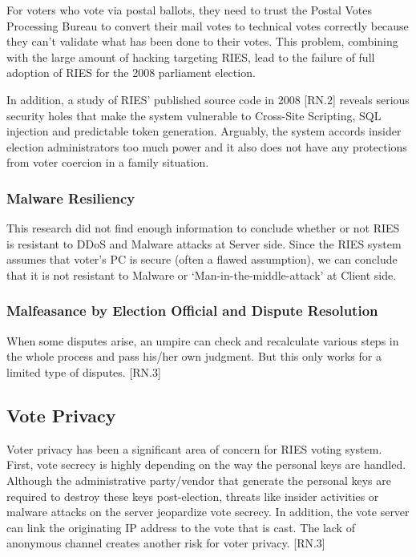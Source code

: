 For voters who vote via postal ballots, they need to trust the Postal Votes Processing Bureau to convert their mail votes to technical votes correctly because they can't validate what has been done to their votes. This problem, combining with the large amount of hacking targeting RIES, lead to the failure of full adoption of RIES for the 2008 parliament election.

In addition, a study of RIES' published source code in 2008 [RN.2] reveals serious security holes that make the system vulnerable to Cross-Site Scripting, SQL injection and predictable token generation. Arguably, the system accords insider election administrators too much power and it also does not have any protections from voter coercion in a family situation.

\subsubsection{Malware Resiliency}

This research did not find enough information to conclude whether or not RIES is resistant to DDoS and Malware attacks at Server side. Since the RIES system assumes that voter's PC is secure (often a flawed assumption), we can conclude that it is not resistant to Malware or `Man-in-the-middle-attack' at Client side.

\subsubsection{Malfeasance by Election Official and Dispute Resolution}

When some disputes arise, an umpire can check and recalculate various steps in the whole process and pass his/her own judgment. But this only works for a limited type of disputes. [RN.3]

\subsection{Vote Privacy}

Voter privacy has been a significant area of concern for RIES voting system. First, vote secrecy is highly depending on the way the personal keys are handled. Although the administrative party/vendor that generate the personal keys are required to destroy these keys post-election, threats like insider activities or malware attacks on the server jeopardize vote secrecy. In addition, the vote server can link the originating IP address to the vote that is cast. The lack of anonymous channel creates another risk for voter privacy. [RN.3]

